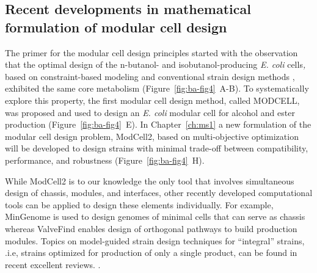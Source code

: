 \subsection{Recent developments in mathematical formulation of modular cell design}


The primer for the modular cell design principles started with the observation \citep{trinh2012} that the optimal design of the n-butanol- and isobutanol-producing \emph{E.
coli} cells\emph{,} based on constraint-based modeling \citep{palsson2015} and conventional strain design methods \citep{trinh2009}, exhibited the same core metabolism (Figure~\ref{fig:ba-fig4}~A-B).
To systematically explore this property, the first modular cell design method, called MODCELL, was proposed and used to design an \emph{E.
coli} modular cell for alcohol and ester production \citep{trinh2015} (Figure~\ref{fig:ba-fig4}~E).
In Chapter~\ref{ch:ms1} a new formulation of the modular cell design problem, ModCell2, based on multi-objective optimization will be developed to design strains with minimal trade-off between compatibility, performance, and robustness (Figure~\ref{fig:ba-fig4}~H).


While ModCell2 is to our knowledge the only tool that involves simultaneous design of chassis, modules, and interfaces, other recently developed computational tools can be applied to design these elements individually.
For example, MinGenome \citep{wang2018} is used to design genomes of minimal cells that can serve as chassis whereas ValveFind \citep{pandit2017} enables design of orthogonal pathways to build production modules.
Topics on model-guided strain design techniques for ``integral'' strains, .i.e, strains optimized for production of only a single product, can be found in recent excellent reviews.
\citep{long2015, machado2015, ng2015}.

